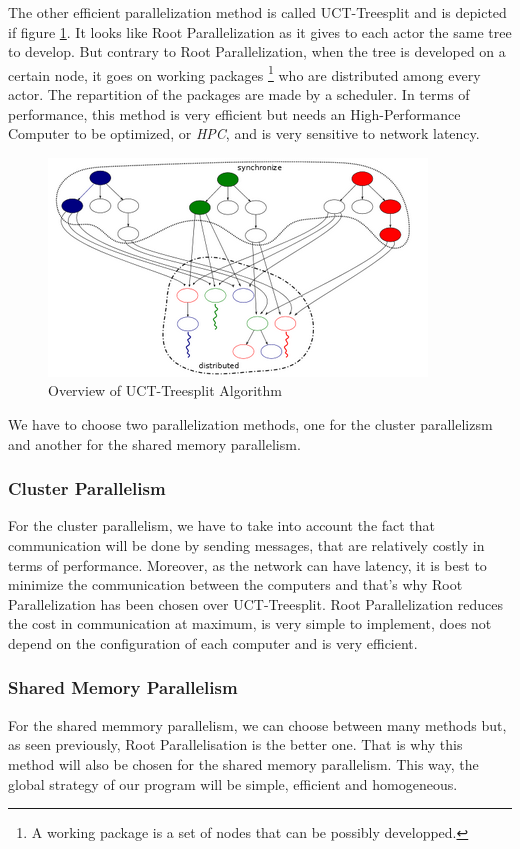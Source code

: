 The other efficient parallelization method is called UCT-Treesplit and is depicted if figure \ref{fig:treesplit}. It looks like Root Parallelization as it gives to each actor the same tree to develop.
But contrary to Root Parallelization, when the tree is developed on a certain node, it goes on working packages \footnote{A working package is a set of nodes that can be possibly developped.} who are distributed among every actor. The repartition of the packages are made by a scheduler.
In terms of performance, this method is very efficient but needs an High-Performance Computer to be optimized, or \emph{HPC}, and is very sensitive to network latency.

\begin{figure}[!ht] 
\centerline{\includegraphics[scale=0.80]{3Methods/3.1Parallelization_Method/treesplit.png}}
   \caption{Overview of UCT-Treesplit Algorithm \cite{treesplit}}
\label{fig:treesplit}
\end{figure}


We have to choose two parallelization methods, one for the cluster parallelizsm and another for the shared memory parallelism.
\subsubsection{Cluster Parallelism}
For the cluster parallelism, we have to take into account the fact that communication will be done by sending messages, that are relatively costly in terms of performance.
Moreover, as the network can have latency, it is best to minimize the communication between the computers and that's why Root Parallelization has been chosen over 	UCT-Treesplit.
Root Parallelization reduces the cost in communication at maximum, is very simple to implement, does not depend on the configuration of each computer and is very efficient\cite{parallel_comp}.

\subsubsection{Shared Memory Parallelism}
For the shared memmory parallelism, we can choose between many methods but, as seen previously, Root Parallelisation is the better one.\cite{parallel_comp}
That is why this method will also be chosen for the shared memory parallelism. This way, the global strategy of our program will be simple, efficient and homogeneous.